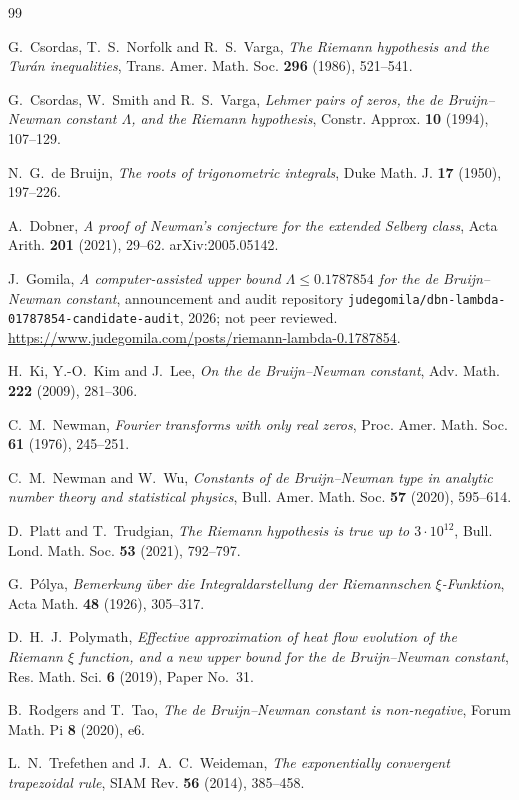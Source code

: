 \documentclass[11pt]{article}
\numberwithin{equation}{section}
\theoremstyle{definition}
\theoremstyle{remark}
\begin{document}
\begingroup\raggedright
\begin{thebibliography}{99}

G.~Csordas, T.~S.~Norfolk and R.~S.~Varga,
\emph{The Riemann hypothesis and the Tur\'an inequalities},
Trans. Amer. Math. Soc. \textbf{296} (1986), 521--541.

G.~Csordas, W.~Smith and R.~S.~Varga,
\emph{Lehmer pairs of zeros, the de Bruijn--Newman constant $\Lambda$, and
the Riemann hypothesis},
Constr. Approx. \textbf{10} (1994), 107--129.

N.~G.~de Bruijn,
\emph{The roots of trigonometric integrals},
Duke Math. J. \textbf{17} (1950), 197--226.

A.~Dobner,
\emph{A proof of Newman's conjecture for the extended Selberg class},
Acta Arith. \textbf{201} (2021), 29--62. arXiv:2005.05142.

J.~Gomila,
\emph{A computer-assisted upper bound $\Lambda\le0.1787854$ for the
de Bruijn--Newman constant}, announcement and audit repository
\texttt{judegomila/dbn-lambda-01787854-candidate-audit}, 2026; not peer
reviewed.
\url{https://www.judegomila.com/posts/riemann-lambda-0.1787854}.

H.~Ki, Y.-O.~Kim and J.~Lee,
\emph{On the de Bruijn--Newman constant},
Adv. Math. \textbf{222} (2009), 281--306.

C.~M.~Newman,
\emph{Fourier transforms with only real zeros},
Proc. Amer. Math. Soc. \textbf{61} (1976), 245--251.

C.~M.~Newman and W.~Wu,
\emph{Constants of de Bruijn--Newman type in analytic number theory and
statistical physics},
Bull. Amer. Math. Soc. \textbf{57} (2020), 595--614.

D.~Platt and T.~Trudgian,
\emph{The Riemann hypothesis is true up to $3\cdot10^{12}$},
Bull. Lond. Math. Soc. \textbf{53} (2021), 792--797.

G.~P\'olya,
\emph{Bemerkung \"uber die Integraldarstellung der Riemannschen
$\xi$-Funktion},
Acta Math. \textbf{48} (1926), 305--317.

D.~H.~J.~Polymath,
\emph{Effective approximation of heat flow evolution of the Riemann $\xi$
function, and a new upper bound for the de Bruijn--Newman constant},
Res. Math. Sci. \textbf{6} (2019), Paper No.~31.

B.~Rodgers and T.~Tao,
\emph{The de Bruijn--Newman constant is non-negative},
Forum Math. Pi \textbf{8} (2020), e6.

L.~N.~Trefethen and J.~A.~C.~Weideman,
\emph{The exponentially convergent trapezoidal rule},
SIAM Rev. \textbf{56} (2014), 385--458.

\end{thebibliography}
\endgroup
\end{document}
